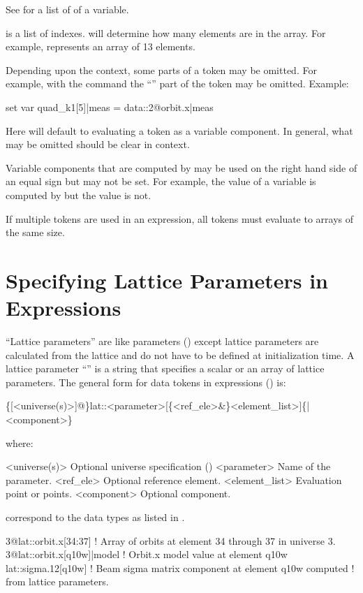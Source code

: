 See  for a list of  of a variable.

 is a list of indexes.  will determine how many elements are in
the array. For example,  represents an array of 13 elements.

Depending upon the context, some parts of a token may be omitted. For example, with the  command the ``'' part of the token may be omitted.  Example:
\begin{example}
  set var quad_k1[5]|meas = data::2@orbit.x|meas
\end{example}
Here \tao will default to evaluating a token as a variable component. In general, what may be
omitted should be clear in context.

Variable components that are computed by \tao may be used on the right hand side of an equal sign
but may not be set. For example, the  value of a variable is computed by \tao but the
 value is not.

If multiple tokens are used in an expression, all tokens must evaluate to arrays of the same size.

\section{Specifying Lattice Parameters in Expressions}
\label{s:lat.token}

``Lattice parameters'' are like  parameters () except lattice parameters
are calculated from the lattice and do not have to be defined at initialization time.  A lattice
parameter ``'' is a string that specifies a scalar or an array of lattice parameters. The
general form for data tokens in expressions () is:
\begin{example}
  \{[<universe(s)>]@\}lat::<parameter>[\{<ref_ele>&\}<element_list>]\{|<component>\}
\end{example}
where:
\begin{example}
  <universe(s)>       Optional universe specification ()
  <parameter>         Name of the parameter.
  <ref_ele>           Optional reference element.
  <element_list>      Evaluation point or points.
  <component>         Optional component. 
\end{example}
correspond to the data types as listed in . 
\begin{example}
  3@lat::orbit.x[34:37]         ! Array of orbits at element 34 through 37 in universe 3.
  3@lat::orbit.x[q10w]|model    ! Orbit.x model value at element q10w
  lat::sigma.12[q10w]           ! Beam sigma matrix component at element q10w computed 
                                !  from lattice parameters.
\end{example}

